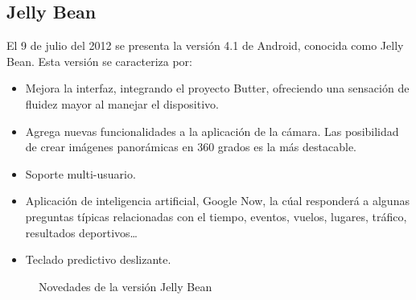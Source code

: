 \subsection{Jelly Bean}

El 9 de julio del 2012 se presenta la versión 4.1 de Android, conocida como Jelly Bean. Esta versión se caracteriza por:
\begin{itemize}
\item Mejora la interfaz, integrando el proyecto Butter, ofreciendo una sensación de fluidez mayor al manejar el dispositivo.
\item Agrega nuevas funcionalidades a la aplicación de la cámara. Las posibilidad de crear imágenes panorámicas en 360 grados es la más destacable.
\item Soporte multi-usuario.
\item Aplicación de inteligencia artificial, Google Now, la cúal responderá a algunas preguntas típicas relacionadas con el tiempo, eventos, vuelos, lugares, tráfico, resultados deportivos\ldots
\item Teclado predictivo deslizante.
\end{itemize}

\begin{figure}[!h]
	\centering	
	\hspace{0.8cm}
	\caption{Novedades de la versión Jelly Bean}
\end{figure}


